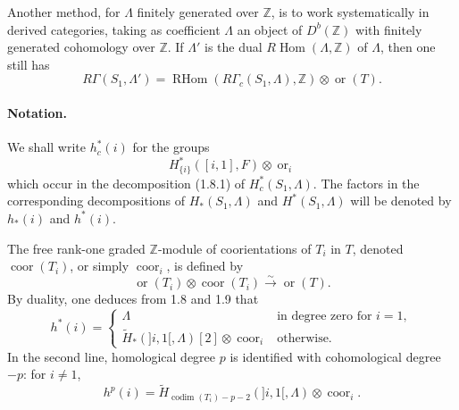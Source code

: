\documentclass[11pt]{article}
\theoremstyle{definition}
\newcommand{\ZZ}{\mathbb Z}
\newcommand{\Hom}{\operatorname{Hom}}
\newcommand{\RHom}{\operatorname{RHom}}
\newcommand{\codim}{\operatorname{codim}}
\newcommand{\ornt}{\operatorname{or}}
\newcommand{\coor}{\operatorname{coor}}
\begin{document}
Another method, for $\Lambda$ finitely generated over $\ZZ$, is to work systematically in derived categories, taking as coefficient $\Lambda$ an object of $D^b(\ZZ)$ with finitely generated cohomology over $\ZZ$.  If $\Lambda'$ is the dual $R\Hom(\Lambda,\ZZ)$ of $\Lambda$, then one still has
\[
R\Gamma(S_1,\Lambda')=\RHom(R\Gamma_c(S_1,\Lambda),\ZZ)\otimes\ornt(T).
\]

\paragraph{Notation.} We shall write $h_c^*(i)$ for the groups
\[
H^*_{\{i\}}([i,1],F)\otimes\ornt_i
\]
which occur in the decomposition (1.8.1) of $H_c^*(S_1,\Lambda)$.  The factors in the corresponding decompositions of $H_*(S_1,\Lambda)$ and $H^*(S_1,\Lambda)$ will be denoted by $h_*(i)$ and $h^*(i)$.

The free rank-one graded $\ZZ$-module of coorientations of $T_i$ in $T$, denoted $\coor(T_i)$, or simply $\coor_i$, is defined by
\[
\ornt(T_i)\otimes\coor(T_i)\xrightarrow{\sim}\ornt(T).
\]
By duality, one deduces from 1.8 and 1.9 that
\begin{equation}
h^*(i)=
\begin{cases}
\Lambda & \text{in degree zero for }i=1,\\
\widetilde H_*(]i,1[,\Lambda)[2]\otimes\coor_i & \text{otherwise.}
\end{cases}\tag{1.10.1}
\end{equation}
In the second line, homological degree $p$ is identified with cohomological degree $-p$: for $i\neq 1$,
\[
h^p(i)=\widetilde H_{\codim(T_i)-p-2}(]i,1[,\Lambda)\otimes\coor_i.
\]
\end{document}
